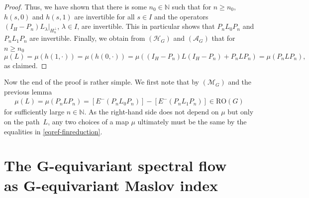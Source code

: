 \documentclass[pdftex]{sigma}
\numberwithin{equation}{section}
\theoremstyle{definition}
\begin{document}
\begin{proof}
Thus, we have shown that there is some $n_0\in\mathbb{N}$ such that for $n\geq n_0$, $h(s,0)$ and $h(s,1)$ are invertible for all $s\in I$ and the operators $(I_H-P_n)L_\lambda|_{H^\perp_n}$, $\lambda\in I$, are invertible. This in particular shows that $P_nL_0 P_n$ and $P_n L_1 P_n$ are invertible. Finally, we obtain from $(\mathcal{H}_G)$ and $(\mathcal{A}_G)$ that for $n\geq n_0$
\[\mu(L)=\mu(h(1,\cdot))=\mu(h(0,\cdot))=\mu((I_H-P_n)L(I_H-P_n)+P_nL P_n)=\mu(P_n LP_n),\]
as claimed.
\end{proof}

Now the end of the proof is rather simple. We first note that by $(\mathcal{M}_G)$ and the previous lemma
\begin{align}\label{eqref-finreduction}
\mu(L)=\mu(P_n LP_n)=[E^-(P_n L_0 P_n)]-[E^-(P_n L_1 P_n)]\in \mathrm{RO}(G)
\end{align}
for sufficiently large $n\in\mathbb{N}$. As the right-hand side does not depend on $\mu$ but only on the path~$L$, any two choices of a map $\mu$ ultimately must be the same by the equalities in \eqref{eqref-finreduction}.

\section[The G-equivariant spectral flow as G-equivariant Maslov index]{The $\boldsymbol{G}$-equivariant spectral flow\\ as $\boldsymbol{G}$-equivariant Maslov index}
\end{document}
